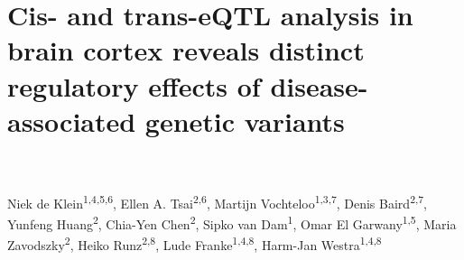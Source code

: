 \chapterfont{\color{DarkOrange}}  %
\sectionfont{\color{DarkOrange}}  %
\subsectionfont{\color{DarkOrange}}  %

\renewcommand\pcolor{DarkOrange}
\renewcommand{\headrule}{\hbox to\headwidth{%
		\color{DarkOrange}\leaders\hrule height \headrulewidth\hfill}} %
\fancyfoot[LE,RO]{\thepage}

{ \Large {} }

\chapter[Cis- and trans-eQTL analysis in brain cortex reveals distinct regulatory effects of disease-associated genetic variants]{Cis- and trans-eQTL analysis in brain cortex reveals distinct regulatory effects of disease-associated genetic variants}
\chaptermark{}

\label{chap:chapter5-brain}

\noindent
\\
\\

Niek de Klein\textsuperscript{1,4,5,6}, Ellen A. Tsai\textsuperscript{2,6}, Martijn Vochteloo\textsuperscript{1,3,7}, Denis Baird\textsuperscript{2,7}, Yunfeng Huang\textsuperscript{2}, Chia-Yen Chen\textsuperscript{2}, Sipko van Dam\textsuperscript{1}, Omar El Garwany\textsuperscript{1,5}, Maria Zavodszky\textsuperscript{2}, Heiko Runz\textsuperscript{2,8}, Lude Franke\textsuperscript{1,4,8}, Harm-Jan Westra\textsuperscript{1,4,8}






